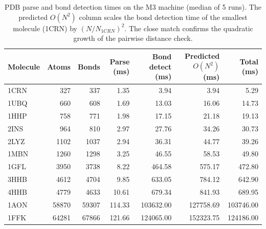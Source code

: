 \begin{table}[H]
    \centering
    \small
    \begin{tabular}{lrrrrrr}
        \toprule
        Molecule & Atoms & Bonds & Parse (ms) & Bond detect (ms) & Predicted $O(N^2)$ (ms) & Total (ms) \\
        \midrule
        1CRN & 327 & 337 & 1.35 & 3.94 & 3.94 & 5.29 \\
        1UBQ & 660 & 608 & 1.69 & 13.03 & 16.06 & 14.73 \\
        1HHP & 758 & 771 & 1.98 & 17.15 & 21.18 & 19.13 \\
        2INS & 964 & 810 & 2.97 & 27.76 & 34.26 & 30.73 \\
        2LYZ & 1102 & 1037 & 2.94 & 36.31 & 44.77 & 39.26 \\
        1MBN & 1260 & 1298 & 3.25 & 46.55 & 58.53 & 49.80 \\
        1GFL & 3950 & 3738 & 8.22 & 464.58 & 575.17 & 472.80 \\
        3HHB & 4612 & 4704 & 9.85 & 633.05 & 784.12 & 642.90 \\
        4HHB & 4779 & 4633 & 10.61 & 679.34 & 841.93 & 689.95 \\
        1AON & 58870 & 59307 & 114.33 & 103632.00 & 127758.69 & 103746.00 \\
        1FFK & 64281 & 67866 & 121.66 & 124065.00 & 152323.75 & 124186.00 \\
        \bottomrule
    \end{tabular}
    \caption{PDB parse and bond detection times on the M3 machine (median of 5 runs). The predicted $O(N^2)$ column scales the bond detection time of the smallest molecule (1CRN) by $(N/N_{1CRN})^2$. The close match confirms the quadratic growth of the pairwise distance check.}
    \label{tab:load_m3}
\end{table}
